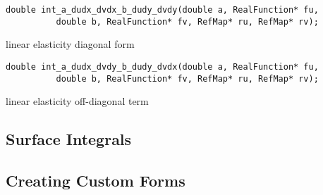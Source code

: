 \begin{lstlisting}
double int_a_dudx_dvdx_b_dudy_dvdy(double a, RealFunction* fu,
          double b, RealFunction* fv, RefMap* ru, RefMap* rv);
\end{lstlisting}
     {linear elasticity diagonal form}


\begin{lstlisting}
double int_a_dudx_dvdy_b_dudy_dvdx(double a, RealFunction* fu,
          double b, RealFunction* fv, RefMap* ru, RefMap* rv);
\end{lstlisting}
     {linear elasticity off-diagonal term}






\subsection{Surface Integrals}
\label{sec:surfint}


\subsection{Creating Custom Forms}
